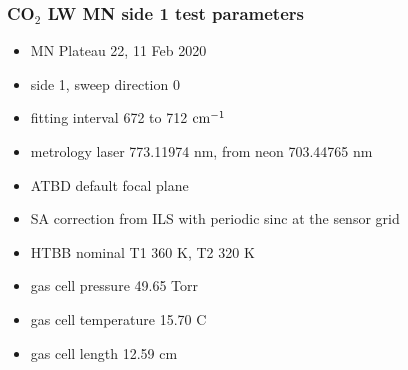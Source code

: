 \documentclass[9pt]{beamer}
\begin{document}
\begin{frame}
\frametitle{CO$_2$ LW MN side 1 test parameters}

\begin{itemize}
  \item MN Plateau 22, 11 Feb 2020
  \item side 1, sweep direction 0
  \item fitting interval 672 to 712 $\mbox{cm$^{-1}$}$
  \item metrology laser 773.11974 nm, from neon 703.44765 nm
  \item ATBD default focal plane
  \item SA correction from ILS with periodic sinc at the sensor grid
  \item HTBB nominal T1 360 K, T2 320 K
  \item gas cell pressure 49.65 Torr
  \item gas cell temperature 15.70 C
  \item gas cell length 12.59 cm
\end{itemize}

\end{frame}
\end{document}
